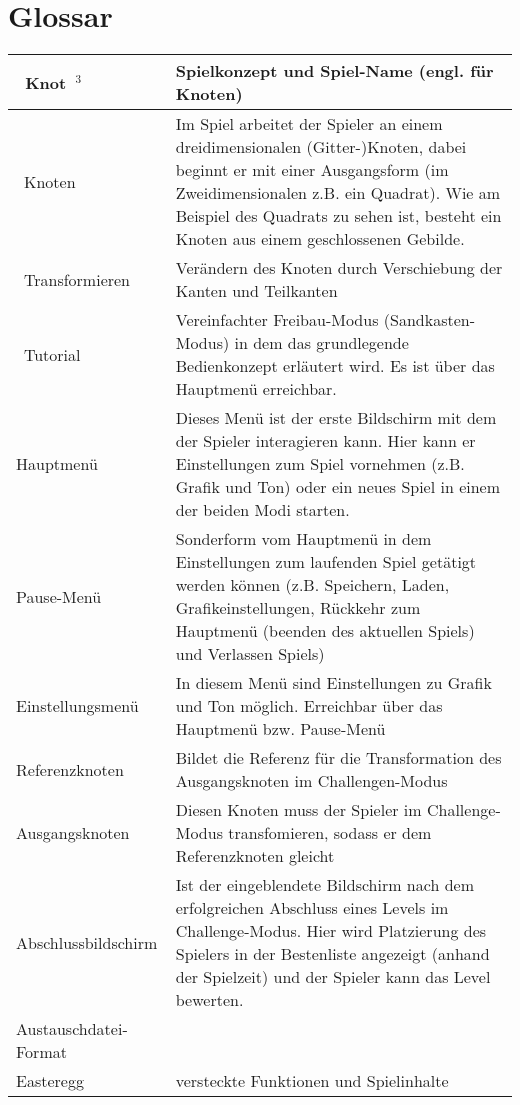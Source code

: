 \chapter{Glossar}

\begin{longtable}{|p{}|p{}|}
\hline 
\ Knot~$^3$ & Spielkonzept und Spiel-Name (engl. für Knoten)\\
\hline
\ Knoten & Im Spiel arbeitet der Spieler an einem dreidimensionalen (Gitter-)Knoten, dabei beginnt er mit einer Ausgangsform (im Zweidimensionalen z.B. ein Quadrat). Wie am Beispiel des Quadrats zu sehen ist, besteht ein Knoten aus einem geschlossenen Gebilde.\\
\hline
\ Transformieren & Verändern des Knoten durch Verschiebung der Kanten und Teilkanten\\
\hline 
\ Tutorial & Vereinfachter Freibau-Modus (Sandkasten-Modus)  in dem das grundlegende Bedienkonzept erläutert wird. Es ist über das Hauptmenü erreichbar.\\
\hline 
Hauptmenü & Dieses Menü ist der erste Bildschirm mit dem der Spieler interagieren kann. Hier kann er Einstellungen zum Spiel vornehmen (z.B. Grafik und Ton) oder ein neues Spiel in einem der beiden Modi starten. \\ 
\hline 
Pause-Menü & Sonderform vom Hauptmenü in dem Einstellungen zum laufenden Spiel getätigt werden können (z.B. Speichern, Laden, Grafikeinstellungen, Rückkehr zum Hauptmenü (beenden des aktuellen Spiels) und Verlassen Spiels) \\ 
\hline 
Einstellungsmenü & In diesem Menü sind Einstellungen zu Grafik und Ton möglich. Erreichbar über das Hauptmenü bzw. Pause-Menü \\ 
\hline 
Referenzknoten & Bildet die Referenz für die Transformation des Ausgangsknoten im Challengen-Modus\\ 
\hline 
Ausgangsknoten & Diesen Knoten muss der Spieler im Challenge-Modus transfomieren, sodass er dem Referenzknoten gleicht \\ 
\hline 
Abschlussbildschirm & Ist der eingeblendete Bildschirm nach dem erfolgreichen Abschluss eines Levels im Challenge-Modus. Hier wird Platzierung des Spielers in der Bestenliste angezeigt (anhand der Spielzeit) und der Spieler kann das Level bewerten.\\ 
\hline 
Austauschdatei-Format & %
\\
\hline 
Easteregg & versteckte Funktionen und Spielinhalte %
\\

\end{longtable}
